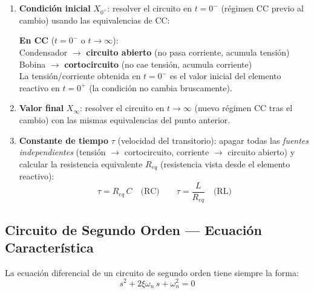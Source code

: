 \documentclass[12pt,a4paper]{article}
\begin{document}
\begin{enumerate}[leftmargin=2em, itemsep=6pt]

  \item \textbf{Condición inicial} $X_{0^+}$: resolver el circuito en $t = 0^-$
  (régimen CC previo al cambio) usando las equivalencias de CC:
  \begin{formulabox}
    \textbf{En CC} ($t = 0^-$ o $t \to \infty$):\\[4pt]
    \quad Condensador $\longrightarrow$ \textbf{circuito abierto} \quad
    (no pasa corriente, acumula tensión)\\
    \quad Bobina $\longrightarrow$ \textbf{cortocircuito} \quad
    (no cae tensión, acumula corriente)\\[4pt]
    La tensión/corriente obtenida en $t = 0^-$ es el valor inicial del elemento reactivo
    en $t = 0^+$ (la condición no cambia bruscamente).
  \end{formulabox}

  \item \textbf{Valor final} $X_\infty$: resolver el circuito en $t \to \infty$
  (nuevo régimen CC tras el cambio) con las mismas equivalencias del punto anterior.

  \item \textbf{Constante de tiempo} $\tau$ (velocidad del transitorio): apagar todas las \emph{fuentes independientes}
  (tensión $\to$ cortocircuito, corriente $\to$ circuito abierto) y calcular la resistencia
  equivalente $R_{eq}$ (resistencia vista desde el elemento reactivo):
  \[
    \tau = R_{eq}\,C \quad \text{(RC)} \qquad \tau = \frac{L}{R_{eq}} \quad \text{(RL)}
  \]
\end{enumerate}
\clearpage %
\subsection{Circuito de Segundo Orden — Ecuación Característica}

La ecuación diferencial de un circuito de segundo orden tiene siempre la forma:
\[
  s^2 + 2\xi\omega_n\,s + \omega_n^2 = 0
\]
\end{document}
